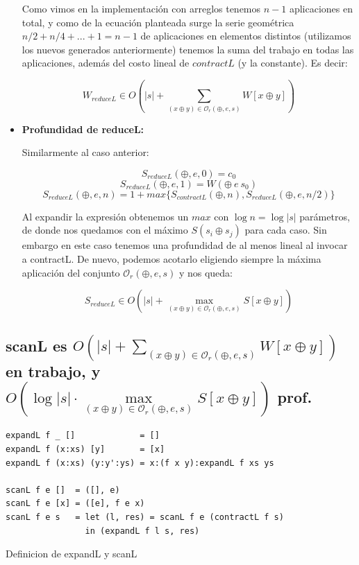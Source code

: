 \documentclass[12pt]{article}
\begin{document}
\begin{itemize}
    Como vimos en la implementación con arreglos tenemos $n-1$ aplicaciones en total, y como de la ecuación planteada surge la serie geométrica $n/2 + n/4 + ... + 1 = n-1$ de aplicaciones en elementos distintos (utilizamos los nuevos generados anteriormente) tenemos la suma del trabajo en todas las aplicaciones, además del costo lineal de $contractL$ (y la constante). Es decir:
    
    $$ W_{reduceL} \in O(|s| + \sum\limits_{(x\oplus y)\in\mathcal{O}_r(\oplus,e,s)} W[x\oplus y]) $$

\item \textbf{Profundidad de reduceL:}

    Similarmente al caso anterior:
    
    $$ S_{reduceL}(\oplus, e, 0) = c_0 $$
    $$ S_{reduceL}(\oplus, e, 1) = W(\oplus\ e\ s_0) $$
    $$ S_{reduceL}(\oplus, e, n) = 1 + max\{ S_{contractL}(\oplus, n), S_{reduceL}(\oplus, e, n/2) \} $$
    
    Al expandir la expresión obtenemos un $max$ con $\log n = \log |s|$ parámetros, de donde nos quedamos con el máximo $S(s_i \oplus s_j)$ para cada caso. Sin embargo en este caso tenemos una profundidad de al menos lineal al invocar a contractL. De nuevo, podemos acotarlo eligiendo siempre la máxima aplicación del conjunto $\mathcal{O}_r(\oplus,e,s)$ y nos queda:

    $$ S_{reduceL} \in O(|s| + \max\limits_{(x\oplus y)\in\mathcal{O}_r(\oplus,e,s)} S[x\oplus y]) $$
    
\end{itemize}


\subsection{scanL es $O(|s| + \sum\limits_{(x\oplus y)\in\mathcal{O}_r(\oplus,e,s)} W[x\oplus y])$ en trabajo, y $O(\log |s|\cdot \max\limits_{(x\oplus y)\in\mathcal{O}_r(\oplus,e,s)} S[x\oplus y])$ prof.}

\begin{table}[h]
\begin{lstlisting}
expandL f _ []             = []
expandL f (x:xs) [y]       = [x]
expandL f (x:xs) (y:y':ys) = x:(f x y):expandL f xs ys

scanL f e []  = ([], e)
scanL f e [x] = ([e], f e x)
scanL f e s   = let (l, res) = scanL f e (contractL f s) 
                in (expandL f l s, res)
\end{lstlisting}

\caption{Definicion de expandL y scanL}
\end{table}
\end{document}
